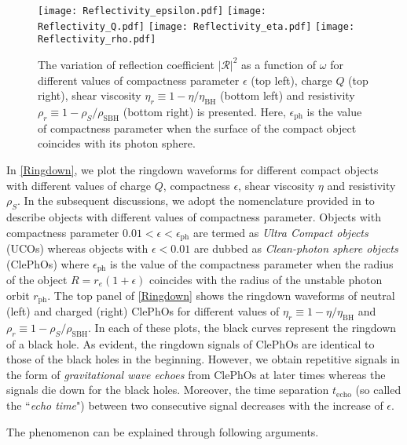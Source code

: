 \documentclass[aps,prd,twocolumn,floatfix,noshowpacs,tightenlines,noshowkeys,superscriptaddress,amsmath,amssymb,
nofootinbib]{revtex4-1}
\renewcommand\[{\begin{equation}}
\renewcommand\]{\end{equation}}
\begin{document}
\begin{figure*}[th]
	\centering
	\texttt{[image: Reflectivity\_epsilon.pdf]}
	\endminipage\hfill
	\texttt{[image: Reflectivity\_Q.pdf]}
	\endminipage\hfill
	\texttt{[image: Reflectivity\_eta.pdf]}
	\endminipage\hfill
	\texttt{[image: Reflectivity\_rho.pdf]}
	\endminipage
	\caption{The variation of reflection coefficient $|\mathcal{R}|^2$ as a function of $\omega$ for different values of compactness parameter $\epsilon$ (top left), charge $Q$ (top right), shear viscosity $\eta_r\equiv1-\eta/\eta_{\textrm{BH}}$ (bottom left) and resistivity $\rho_r\equiv1-\rho_{S}/\rho_{\textrm{SBH}}$ (bottom right) is presented. Here, $\epsilon_{\textrm{ph}}$ is the value of compactness parameter when the surface of the compact object coincides with its photon sphere.    }\label{Reflectivity}
\end{figure*}
In \autoref{Ringdown}, we plot the ringdown waveforms for different compact objects with different values of charge $Q$, compactness $\epsilon$, shear viscosity $\eta$ and resistivity $\rho_{S}$. In the subsequent discussions, we adopt the nomenclature provided in \cite{Cardoso:2019rvt,Cardoso:2017njb} to describe objects with different values of compactness parameter. Objects with compactness parameter $0.01<\epsilon<\epsilon_{\textrm{ph}}$ are termed as \textit{Ultra Compact objects} (UCOs) whereas objects with $\epsilon<0.01$ are dubbed as \textit{Clean-photon sphere objects} (ClePhOs) where $\epsilon_{\textrm{ph}}$ is the value of the compactness parameter when the radius of the object $R=r_e(1+\epsilon)$ coincides with the radius of the unstable photon orbit $r_{\textrm{ph}}$. The top panel of \autoref{Ringdown} shows the ringdown waveforms of neutral (left) and charged (right) ClePhOs for different values of $\eta_r\equiv1-\eta/\eta_{\textrm{BH}}$ and $\rho_r\equiv1-\rho_{S}/\rho_{\textrm{SBH}}$. In each of these plots, the black curves represent the ringdown of a black hole. As evident, the ringdown signals of ClePhOs are identical to those of the black holes in the beginning. However, we obtain repetitive signals in the form of \textit{gravitational wave echoes} from ClePhOs at later times whereas the signals die down for the black holes. Moreover, the time separation  $t_{\textrm{echo}}$ (so called the ``\textit{echo time}") between two consecutive signal decreases with the increase of $\epsilon$. \par The phenomenon can be explained through following arguments\cite{Cardoso:2019rvt,Cardoso:2016oxy,Cardoso:2017cqb,Maggio:2020jml}.
\end{document}
